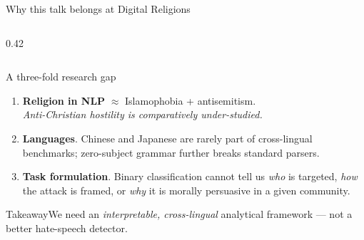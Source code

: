 \documentclass[aspectratio=169,10pt]{beamer}
\newcommand{\keyword}[1]{\textcolor{uzhblue}{\textbf{#1}}}
\newcommand{\takeaway}[1]{%
  \vspace{0.3em}
  \begin{block}{Takeaway}#1\end{block}}
\begin{document}
\begin{frame}{Why this talk belongs at Digital Religions}
\begin{columns}[T,onlytextwidth]
\begin{column}{0.42\textwidth}
    \end{column}
  \end{columns}
\end{frame}

\begin{frame}{A three-fold research gap}
  \begin{enumerate}
    \item \keyword{Religion in NLP} $\approx$ Islamophobia + antisemitism.\\
      \textit{Anti-Christian hostility is comparatively under-studied.}
    \vspace{0.4em}
    \item \keyword{Languages}. Chinese and Japanese are rarely part of
      cross-lingual benchmarks; zero-subject grammar further breaks
      standard parsers.
    \vspace{0.4em}
    \item \keyword{Task formulation}. Binary classification cannot tell us
      \emph{who} is targeted, \emph{how} the attack is framed, or
      \emph{why} it is morally persuasive in a given community.
  \end{enumerate}
  \vspace{0.6em}
  \takeaway{We need an \emph{interpretable, cross-lingual} analytical
  framework — not a better hate-speech detector.}
\end{frame}
\end{document}
